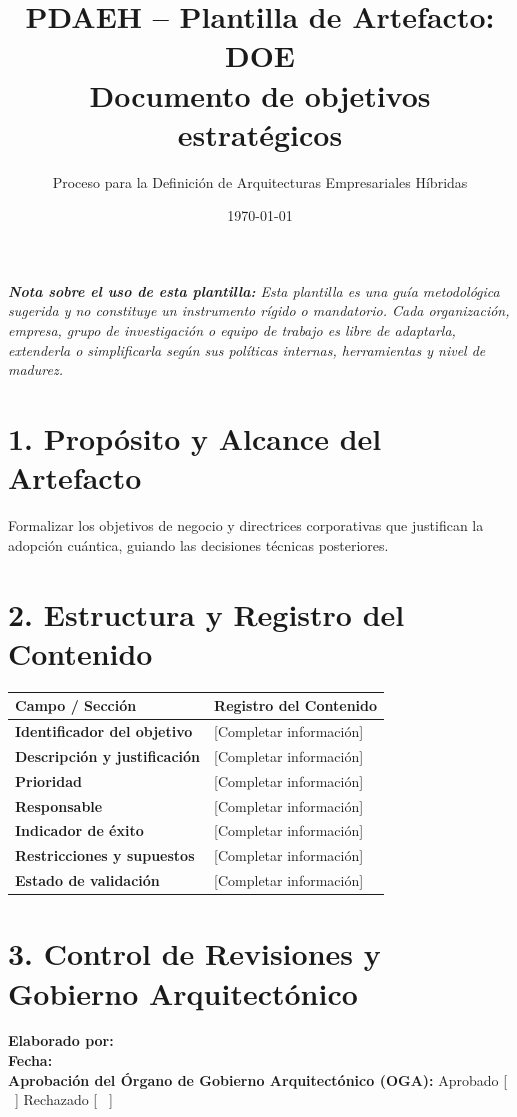 \documentclass[11pt,a4paper]{article}
\title{\textbf{\color{brandgreen} PDAEH -- Plantilla de Artefacto: DOE} \\[0.3em] \large Documento de objetivos estratégicos}
\author{Proceso para la Definición de Arquitecturas Empresariales Híbridas}
\date{\today}
\begin{document}
\maketitle

\noindent \textit{\textbf{Nota sobre el uso de esta plantilla:} Esta plantilla es una guía metodológica sugerida y no constituye un instrumento rígido o mandatorio. Cada organización, empresa, grupo de investigación o equipo de trabajo es libre de adaptarla, extenderla o simplificarla según sus políticas internas, herramientas y nivel de madurez.}

\section*{1. Propósito y Alcance del Artefacto}
Formalizar los objetivos de negocio y directrices corporativas que justifican la adopción cuántica, guiando las decisiones técnicas posteriores.

\section*{2. Estructura y Registro del Contenido}
\begin{tabularx}{\textwidth}{|>{\bfseries}p{4.5cm}|X|}
    \hline
    \rowcolor[gray]{0.92} Campo / Sección & Registro del Contenido \\ \hline
    \textbf{Identificador del objetivo} & [Completar información] \\ \hline
    \textbf{Descripción y justificación} & [Completar información] \\ \hline
    \textbf{Prioridad} & [Completar información] \\ \hline
    \textbf{Responsable} & [Completar información] \\ \hline
    \textbf{Indicador de éxito} & [Completar información] \\ \hline
    \textbf{Restricciones y supuestos} & [Completar información] \\ \hline
    \textbf{Estado de validación} & [Completar información] \\ \hline
\end{tabularx}

\vspace{1.2cm}
\section*{3. Control de Revisiones y Gobierno Arquitectónico}
\noindent \textbf{Elaborado por:} \hrulefill \\[0.5em]
\textbf{Fecha:} \hrulefill \\[0.5em]
\textbf{Aprobación del Órgano de Gobierno Arquitectónico (OGA):} Aprobado [ \, ] \quad Rechazado [ \, ]
\end{document}
